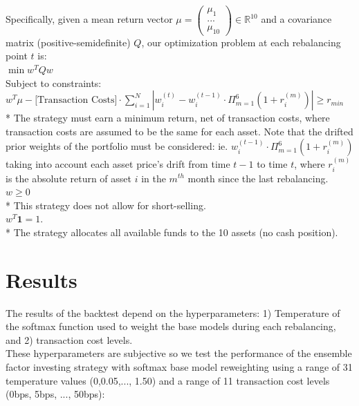 \documentclass{article}
\begin{document}
Specifically, given a mean return vector $\mu = \begin{pmatrix} \mu_1\\
...\\
\mu_{10} \end{pmatrix} \in \mathbb{R}^{10}$ and a covariance matrix (positive-semidefinite) $Q$, our optimization problem at each rebalancing point $t$ is:\\

$\min w^TQw$\\

Subject to constraints:\\

$w^T\mu - \text{[Transaction Costs]} \cdot \sum_{i=1}^N |w_i^{(t)} - w_{i}^{(t-1)} \cdot \Pi_{m=1}^6 (1+r_i^{(m)})| \geq r_{min}$\\

* The strategy must earn a minimum return, net of transaction costs, where transaction costs are assumed to be the same for each asset. Note that the drifted prior weights of the portfolio must be considered: ie. $w_{i}^{(t-1)} \cdot \Pi_{m=1}^6 (1+r_i^{(m)})$ taking into account each asset price's drift from time $t-1$ to time $t$, where $r_i^{(m)}$ is the absolute return of asset $i$ in the $m^{th}$ month since the last rebalancing.\\

$w \geq 0$\\

* This strategy does not allow for short-selling.\\

$w^T \textbf{1} = 1$.\\

* The strategy allocates all available funds to the 10 assets (no cash position).\\

\break

\section{Results}

The results of the backtest depend on the hyperparameters: 1) Temperature of the softmax function used to weight the base models during each rebalancing, and 2) transaction cost levels.\\

These hyperparameters are subjective so we test the performance of the ensemble factor investing strategy with softmax base model reweighting using a range of 31 temperature values (0,0.05,..., 1.50) and a range of 11 transaction cost levels (0bps, 5bps, ..., 50bps):\\
\end{document}
